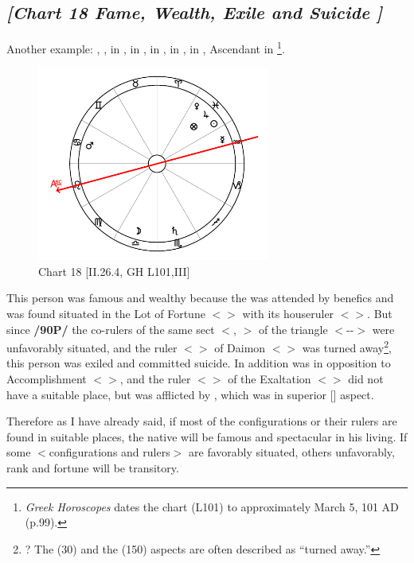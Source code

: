 \newpage
\subsection*{\textit{[Chart 18 Fame, Wealth, Exile and Suicide ]}}

Another example: \Sun, \Jupiter, \Venus\xspace in \Pisces, \Moon\xspace in \Libra, \Mars\xspace in \Cancer, \Mercury\xspace in \Aquarius, \Saturn\xspace in \Scorpio, Ascendant in \Leo
\footnote{\textit{Greek Horoscopes} dates the chart (L101) to approximately March 5, 101 AD (p.99).}.

\clearpage
\begin{figure}
\centering
\vspace{-20pt}
\includegraphics[width=0.68\textwidth]{charts/2_26_4}
\caption{Chart 18 [II.26.4, GH L101,III]}
\label{fig:chart18}
\end{figure}


This person was famous and wealthy because the \Sun\xspace was attended by benefics and was found situated in the Lot of Fortune $<$\Pisces$>$ with its houseruler $<$\Jupiter$>$. But since \textbf{/90P/} the co-rulers of the same sect $<$\Mars, \Moon$>$ of the triangle $<$\Pisces-\Cancer-\Scorpio$>$ were
unfavorably situated, and the ruler $<$\Saturn$>$ of Daimon $<$\Capricorn$>$ was turned away\footnote{\Saturn\xspace \Semisextile\xspace \Moon? The \Semisextile\xspace (30\deg) and the \Quincunx\xspace (150\deg) aspects are often described as ``turned away.''}, this person was exiled and committed suicide. In addition \Mars\xspace was in opposition to Accomplishment $<$\Capricorn$>$, and the ruler $<$\Mercury$>$ of the Exaltation $<$\Virgo$>$ did not have a suitable place, but was afflicted by \Saturn, which was in superior [\Square] aspect.

Therefore \mndl as I have already said, if most of the configurations or their rulers are found in suitable places,
the native will be famous and spectacular in his living. If some $<$configurations and rulers$>$ are favorably
situated, others unfavorably, rank and fortune will be transitory.

\newpage